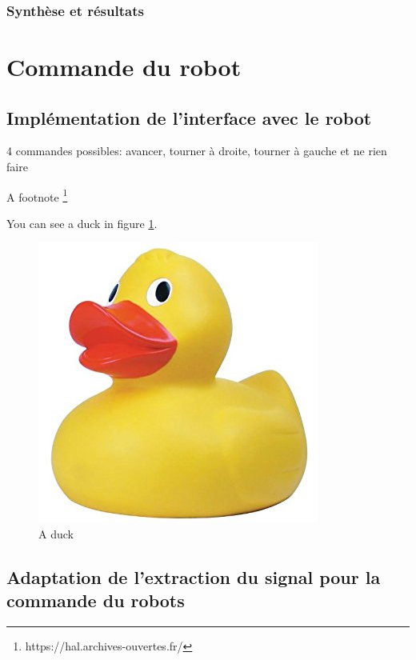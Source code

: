 \documentclass[11pt]{article}
\begin{document}
\subsubsection{Synthèse et résultats}

\cleardoublepage


\section{Commande du robot}

 	  
\subsection{Implémentation de l'interface avec le robot}
4 commandes possibles: avancer, tourner à droite, tourner à gauche et ne rien faire

A footnote \footnote{https://hal.archives-ouvertes.fr/}

You can see a duck in figure \ref{fig:duck}.

\begin{figure}[!h]
\centering
\includegraphics[scale=0.3]{bidon.jpg}
\caption{A duck}
\label{fig:duck}
\end{figure}

\cleardoublepage

\subsection{Adaptation de l'extraction du signal pour la commande du robots}

\cleardoublepage
\end{document}

